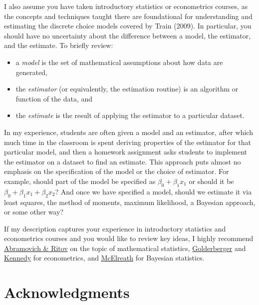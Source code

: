 \documentclass[
  letterpaper,
  DIV=11,
  numbers=noendperiod]{scrreprt}
\providecommand{\tightlist}{%
  \setlength{\itemsep}{0pt}\setlength{\parskip}{0pt}}\usepackage{longtable,booktabs,array}
\begin{document}
I also assume you have taken introductory statistics or econometrics
courses, as the concepts and techniques taught there are foundational
for understanding and estimating the discrete choice models covered by
Train (2009). In particular, you should have no uncertainty about the
difference between a model, the estimator, and the estimate. To briefly
review:

\begin{itemize}
\tightlist
\item
  a \emph{model} is the set of mathematical assumptions about how data
  are generated,
\item
  the \emph{estimator} (or equivalently, the estimation routine) is an
  algorithm or function of the data, and
\item
  the \emph{estimate} is the result of applying the estimator to a
  particular dataset.
\end{itemize}

In my experience, students are often given a model and an estimator,
after which much time in the classroom is spent deriving properties of
the estimator for that particular model, and then a homework assignment
asks students to implement the estimator on a dataset to find an
estimate. This approach puts almost no emphasis on the specification of
the model or the choice of estimator. For example, should part of the
model be specified as \(\beta_0 + \beta_1x_1\) or should it be
\(\beta_0 + \beta_1x_1 + \beta_2x_2\)? And once we have specified a
model, should we estimate it via least squares, the method of moments,
maximum likelihood, a Bayesian approach, or some other way?

If my description captures your experience in introductory statistics
and econometrics courses and you would like to review key ideas, I
highly recommend
\href{https://www.routledge.com/Statistical-Theory-A-Concise-Introduction/Abramovich-Ritov/p/book/9781032007458}{Abramovich
\& Ritov} on the topic of mathematical statistics,
\href{https://www.amazon.com/Course-Econometrics-Arthur-S-Goldberger/dp/0674175441}{Golderberger}
and
\href{https://www.amazon.com/Guide-Econometrics-6th-Peter-Kennedy/dp/1405182571/}{Kennedy}
for econometrics, and
\href{https://xcelab.net/rm/statistical-rethinking/}{McElreath} for
Bayesian statistics.

\section*{Acknowledgments}\label{acknowledgments}
\end{document}
